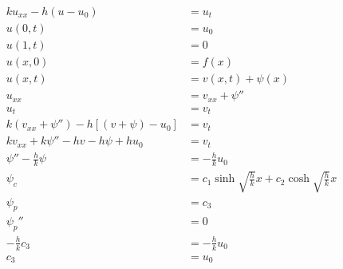 \documentclass{article}
\begin{document}
\subsubsection{}

\begin{align*}
  k u_{x x} - h (u - u_0)                     & = u_t                                                                    \\
  u(0, t)                                     & = u_0                                                                    \\
  u(1, t)                                     & = 0                                                                      \\
  u(x, 0)                                     & = f(x)                                                                   \\
  u(x, t)                                     & = v(x, t) + \psi(x)                                                      \\
  u_{x x}                                     & = v_{x x} + \psi''                                                       \\
  u_t                                         & = v_t                                                                    \\
  k (v_{x x} + \psi'') - h [(v + \psi) - u_0] & = v_t                                                                    \\
  k v_{x x} + k \psi'' - h v - h \psi + h u_0 & = v_t                                                                    \\
  \psi'' - \frac{h}{k} \psi                   & = -\frac{h}{k} u_0                                                       \\
  \psi_c                                      & = c_1 \sinh \sqrt{\frac{h}{k}} x + c_2 \cosh \sqrt{\frac{h}{k}} x        \\
  \psi_p                                      & = c_3                                                                    \\
  \psi_p''                                    & = 0                                                                      \\
  -\frac{h}{k} c_3                            & = -\frac{h}{k} u_0                                                       \\
  c_3                                         & = u_0                                                                    \\

\end{align*}
\end{document}
